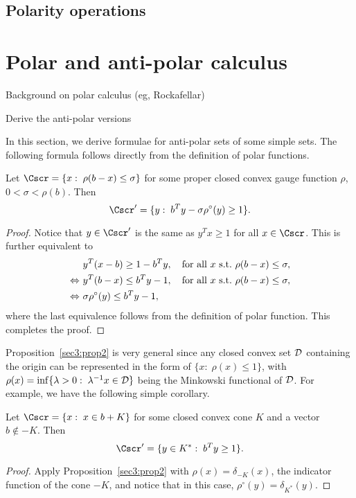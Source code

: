 \documentclass{siamltex}   %
\begin{document}
  \subsection{Polarity operations}
  \label{sec:polarity-operations}

  \section{Polar and anti-polar calculus}
  \label{sec:polar-anti-polar}

  \begin{itemize}{\color{red}
  \item Background on polar calculus (eg, Rockafellar)}{\color{green}
  \item Derive the anti-polar versions}
  \end{itemize}

  In this section, we derive formulae for anti-polar sets of some simple sets.
  The following formula follows directly from the definition of polar functions.
  \begin{proposition}\label{sec3:prop2}
    Let $\Cscr = \{x:\; \rho(b - x)\le \sigma\}$ for some proper closed convex gauge function $\rho$, $0 < \sigma<\rho(b)$. Then
    \[
    \Cscr' = \{y:\; b^Ty - \sigma\rho^\circ(y)\ge 1\}.
    \]
  \end{proposition}
  \begin{proof}
    Notice that $y\in \Cscr'$ is the same as $y^Tx \ge 1$ for all $x\in \Cscr$. This is further equivalent to
    \begin{equation*}
      \begin{split}
        &\ y^T(x-b)\ge 1 - b^Ty,\ \ \ \mbox{for all} \ x \ {\rm s.t.}\ \rho(b - x)\le \sigma,\\
        \Leftrightarrow &\ y^T(b - x)\le b^Ty - 1,\ \ \ \mbox{for all} \ x \ {\rm s.t.}\ \rho(b-x)\le \sigma,\\
        \Leftrightarrow &\ \sigma\rho^\circ(y)\le b^Ty - 1,\\
      \end{split}
    \end{equation*}
    where the last equivalence follows from the definition of polar function. This completes the proof.
  \end{proof}

  Proposition~\ref{sec3:prop2} is very general since any closed convex set ${\cal D}$ containing the origin can be represented in the form of $\{x:\; \rho(x)\le 1\}$,
  with $\rho(x)=\inf\{\lambda> 0:\; \lambda^{-1}x\in {\cal D}\}$ being the Minkowski functional of ${\cal D}$. For example, we have the following simple corollary.
  \begin{corollary}\label{sec3:prop2immedcor}
    Let $\Cscr = \{x:\; x\in b + K\}$ for some closed convex cone $K$ and a vector $b\notin -K$. Then
    \[
    \Cscr' = \{y\in K^*:\; b^Ty \ge 1\}.
    \]
  \end{corollary}
  \begin{proof}
    Apply Proposition~\ref{sec3:prop2} with $\rho(x) = \delta_{-K}(x)$, the indicator function of the cone $-K$, and notice that
    in this case, $\rho^\circ(y) = \delta_{K^*}(y)$.
  \end{proof}
\end{document}
